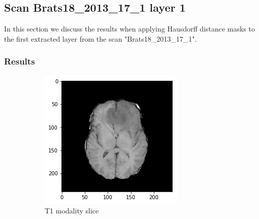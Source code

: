 \subsection{Scan Brats18\_2013\_17\_1 layer 1}
In this section we discuss the results when applying Hausdorff distance masks to the first extracted layer from the scan "Brats18\_2013\_17\_1".

\subsubsection{Results}

\begin{figure}[H]
    \centering
    \begin{subfigure}[t]{.4\textwidth}
        \centering
        \includegraphics[width=\linewidth]{chapters/06_hdm/c_Brats18_2013_17_1_L1/41.png}
        \caption{T1 modality slice}
    \end{subfigure}\hspace{1cm}%
    \begin{subfigure}[t]{.4\textwidth}
        \centering

\end{subfigure}
\end{figure}
